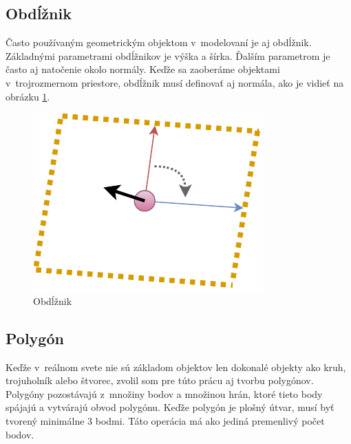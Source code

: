 \subsection*{Obdĺžnik}
Často používaným geometrickým objektom v~modelovaní je aj obdĺžnik. Základnými parametrami obdĺžnikov je výška a šírka. Ďalším parametrom je často aj natočenie okolo normály. Keďže sa zaoberáme objektami v~trojrozmernom priestore, obdĺžnik musí definovať aj normála, ako je vidieť na obrázku \ref{fig:SurfaceCreate Rectangle}.


\begin{figure}[H]
	\centering

	\includegraphics[height=0.3\textwidth]{obrazky-figures/Diagram/Draw/3Plane/DP Navrh operacii-2D - SurfaceCreate Rectangle.pdf}
	\caption{Obdĺžnik}
	\label{fig:SurfaceCreate Rectangle}
\end{figure}



\subsection*{Polygón}
Keďže v~reálnom svete nie sú základom objektov len dokonalé objekty ako kruh, trojuholník alebo štvorec, zvolil som pre túto prácu aj tvorbu polygónov. Polygóny pozostávajú z~množiny bodov a množinou hrán, ktoré tieto body spájajú a vytvárajú obvod polygónu. Keďže polygón je plošný útvar, musí byť tvorený minimálne 3 bodmi. Táto operácia má ako jediná premenlivý počet bodov\cite{modernipocitacovagrafika}. 

